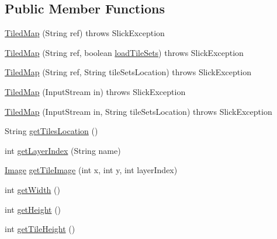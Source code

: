 \subsection*{Public Member Functions}
\begin{DoxyCompactItemize}
\item 
\mbox{\hyperlink{classorg_1_1newdawn_1_1slick_1_1tiled_1_1_tiled_map_a364569bc60c0e5a76a0e0da82c3c2a6a}{Tiled\+Map}} (String ref)  throws Slick\+Exception 
\item 
\mbox{\hyperlink{classorg_1_1newdawn_1_1slick_1_1tiled_1_1_tiled_map_a288b9b24c3f96803f9aa813516e540f5}{Tiled\+Map}} (String ref, boolean \mbox{\hyperlink{classorg_1_1newdawn_1_1slick_1_1tiled_1_1_tiled_map_a49356f102a76e7845f6dfbd4c6b70b59}{load\+Tile\+Sets}})  throws Slick\+Exception 
\item 
\mbox{\hyperlink{classorg_1_1newdawn_1_1slick_1_1tiled_1_1_tiled_map_a33061cc036aa416441dff631f1fc2c75}{Tiled\+Map}} (String ref, String tile\+Sets\+Location)  throws Slick\+Exception 
\item 
\mbox{\hyperlink{classorg_1_1newdawn_1_1slick_1_1tiled_1_1_tiled_map_a7ec50b9ecb5af0e6326dd2dbd0276c50}{Tiled\+Map}} (Input\+Stream in)  throws Slick\+Exception 
\item 
\mbox{\hyperlink{classorg_1_1newdawn_1_1slick_1_1tiled_1_1_tiled_map_a105760713bf32625e188dd4e60989aeb}{Tiled\+Map}} (Input\+Stream in, String tile\+Sets\+Location)  throws Slick\+Exception 
\item 
String \mbox{\hyperlink{classorg_1_1newdawn_1_1slick_1_1tiled_1_1_tiled_map_adecd3ac79ebd72721187e7646d783782}{get\+Tiles\+Location}} ()
\item 
int \mbox{\hyperlink{classorg_1_1newdawn_1_1slick_1_1tiled_1_1_tiled_map_a70c72f5ad1f0fb784c6bfd0dc71d0608}{get\+Layer\+Index}} (String name)
\item 
\mbox{\hyperlink{classorg_1_1newdawn_1_1slick_1_1_image}{Image}} \mbox{\hyperlink{classorg_1_1newdawn_1_1slick_1_1tiled_1_1_tiled_map_ab7e63f5e49d17b00c9f38993d0112712}{get\+Tile\+Image}} (int x, int y, int layer\+Index)
\item 
int \mbox{\hyperlink{classorg_1_1newdawn_1_1slick_1_1tiled_1_1_tiled_map_a1a8a716864f741b9f788138407108eb3}{get\+Width}} ()
\item 
int \mbox{\hyperlink{classorg_1_1newdawn_1_1slick_1_1tiled_1_1_tiled_map_a6370cae21692dded6097e8f877b62cac}{get\+Height}} ()
\item 
int \mbox{\hyperlink{classorg_1_1newdawn_1_1slick_1_1tiled_1_1_tiled_map_a03d0f5ea72a93c1939e97deea19a1d3a}{get\+Tile\+Height}} ()

\end{DoxyCompactItemize}
